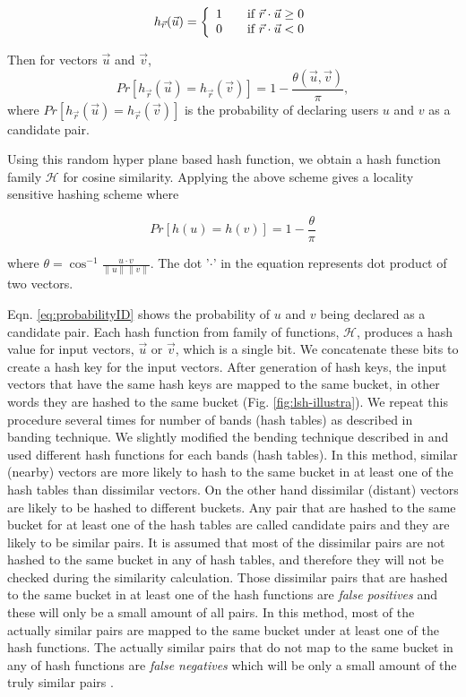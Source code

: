\documentclass[conference]{IEEEtran}
\begin{document}
\begin{equation}
h_{\vec{r}}(\vec{u}) = \left\{ 
  \begin{array}{l l}
    1 & \quad \text{if  } \vec{r} \cdot \vec{u} \geq 0 \\
    0 & \quad \text{if  } \vec{r} \cdot \vec{u}  < 0
  \end{array} \right.
\label{eq:hashing}
\end{equation}

Then for vectors $\vec{u}$ and $\vec{v}$,
$$
 Pr[h_{\vec{r}}(\vec{u}) = h_{\vec{r}}(\vec{v})] = 
 1 - \frac{\theta(\vec{u},\vec{v})}{\pi},
$$
where $Pr[h_{\vec{r}}(\vec{u}) = h_{\vec{r}}(\vec{v})]$ is the probability 
of declaring users $u$ and $v$ as a candidate pair.

Using this random hyper plane based hash function, we obtain a hash function 
family $\mathcal{H}$ for cosine similarity. Applying the above scheme gives a 
locality sensitive hashing scheme where

\begin{equation}
 Pr[h(u)=h(v)] = 1 - \frac{\theta}{\pi}
\label{eq:probabilityID}
\end{equation}

where $\theta = \cos^{-1} \frac{u \cdot v}{\parallel u \parallel \parallel v 
\parallel}$. The dot '$\cdot$' in the equation represents dot product of two 
vectors. 

Eqn. \ref{eq:probabilityID} shows the probability of $u$ and $v$ being declared 
as a candidate pair. Each hash function from family of functions, $\mathcal{H}$, 
produces a hash value for input vectors, $\vec{u}$ or $\vec{v}$, 
which is a single bit. We concatenate these bits to create a
hash key for the input vectors. After generation of hash keys, the input 
vectors that have the same hash keys are mapped to the same bucket, in other 
words they are hashed to the same bucket (Fig. \ref{fig:lsh-illustra}). We repeat 
this procedure several times for number of bands (hash tables) as described in 
banding technique. We slightly modified the bending technique described in 
\cite{Rajaraman:2011:MMD:2124405} and used different hash
functions for each bands (hash tables). In this method, similar (nearby) 
vectors are more likely to hash to the same bucket in at least one of the hash 
tables than dissimilar vectors. On the other hand dissimilar (distant) vectors 
are likely to be hashed to different buckets. Any pair that are hashed to the 
same bucket for at least one of the hash tables are called candidate pairs and 
they are likely to be similar pairs. It is assumed that most of the dissimilar 
pairs are not hashed to the same bucket in any of hash tables, and therefore 
they will not be checked during the similarity calculation. Those dissimilar 
pairs that are hashed to the same bucket in at least one of the hash functions 
are \textit{false positives} and these will only be a small amount of all pairs. 
In this method, most of the actually similar pairs are mapped to the same 
bucket under at least one of the hash functions. The actually similar pairs that 
do not map to the same bucket in any of hash functions are \textit{false negatives} 
which will be only a small amount of the truly similar pairs 
\cite{Rajaraman:2011:MMD:2124405}.
\end{document}
